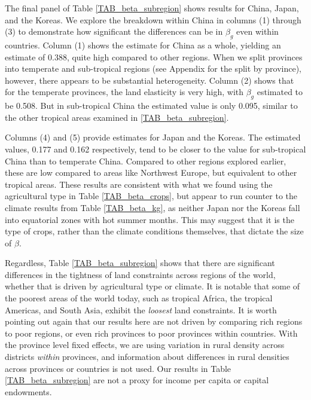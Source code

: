 \documentclass[11pt]{article}
\begin{document}
The final panel of Table \ref{TAB_beta_subregion} shows results for China, Japan, and the Koreas. We explore the breakdown within China in columns (1) through (3) to demonstrate how significant the differences can be in $\beta_g$ even within countries. Column (1) shows the estimate for China as a whole, yielding an estimate of 0.388, quite high compared to other regions. When we split provinces into temperate and sub-tropical regions (see Appendix for the split by province), however, there appears to be substantial heterogeneity. Column (2) shows that for the temperate provinces, the land elasticity is very high, with $\beta_g$ estimated to be 0.508. But in sub-tropical China the estimated value is only 0.095, similar to the other tropical areas examined in \ref{TAB_beta_subregion}.

Columns (4) and (5) provide estimates for Japan and the Koreas. The estimated values, 0.177 and 0.162 respectively, tend to be closer to the value for sub-tropical China than to temperate China. Compared to other regions explored earlier, these are low compared to areas like Northwest Europe, but equivalent to other tropical areas. These results are consistent with what we found using the agricultural type in Table \ref{TAB_beta_crops}, but appear to run counter to the climate results from Table \ref{TAB_beta_kg}, as neither Japan nor the Koreas fall into equatorial zones with hot summer months. This may suggest that it is the type of crops, rather than the climate conditions themselves, that dictate the size of $\beta$.

Regardless, Table \ref{TAB_beta_subregion} shows that there are significant differences in the tightness of land constraints across regions of the world, whether that is driven by agricultural type or climate. It is notable that some of the poorest areas of the world today, such as tropical Africa, the tropical Americas, and South Asia, exhibit the \textit{loosest} land constraints. It is worth pointing out again that our results here are not driven by comparing rich regions to poor regions, or even rich provinces to poor provinces within countries. With the province level fixed effects, we are using variation in rural density across districts \textit{within} provinces, and information about differences in rural densities across provinces or countries is not used. Our results in Table \ref{TAB_beta_subregion} are not a proxy for income per capita or capital endowments.
\end{document}
